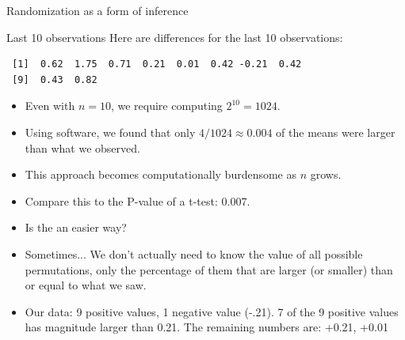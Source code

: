 \begin{frame}{Randomization as a form of inference}
  \framebreak
  
  \begin{exampleblock}{Last 10 observations}
  Here are differences for the last 10 observations:

\begin{knitrout}\small
{}\color{fgcolor}\begin{kframe}
\begin{verbatim}
 [1]  0.62  1.75  0.71  0.21  0.01  0.42 -0.21  0.42
 [9]  0.43  0.82
\end{verbatim}
\end{kframe}
\end{knitrout}
  
  \end{exampleblock}

\framebreak




\begin{itemize}
  \item Even with $n = 10$, we require computing $2^{10} = 1024$.
  \item Using software, we found that only $4/1024 \approx 0.004$ of the means were larger than what we observed.
  \item This approach becomes computationally burdensome as $n$ grows.
  \item Compare this to the P-value of a t-test: 0.007.
\end{itemize}

\framebreak

\begin{itemize}
  \item Is the an easier way?
  \item Sometimes... We don't actually need to know the value of all possible permutations, only the percentage of them that are larger (or smaller) than or equal to what we saw.
  \item Our data: 9 positive values, 1 negative value (-.21). 7 of the 9 positive values has magnitude larger than 0.21. The remaining numbers are: +0.21, +0.01 
\end{itemize}

\end{frame}

